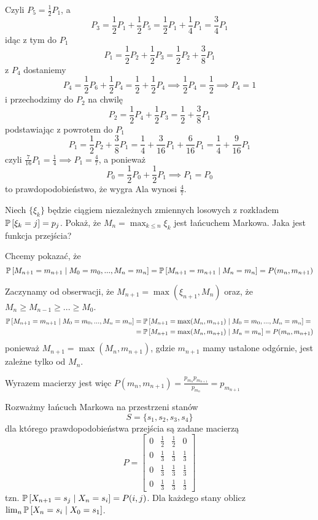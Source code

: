 \begin{solution}
  Czyli $P_5=\frac{1}{2}P_1$, a 
  $$P_3=\frac{1}{2}P_1+\frac{1}{2}P_5=\frac{1}{2}P_1+\frac{1}{4}P_1=\frac{3}{4}P_1$$
  idąc z tym do $P_1$
  $$P_1=\frac{1}{2}P_2+\frac{1}{2}P_3=\frac{1}{2}P_2+\frac{3}{8}P_1$$
  z $P_4$ dostaniemy
  $$P_4=\frac{1}{2} P_6+\frac{1}{2}P_4=\frac{1}{2}+\frac{1}{2}P_4\implies \frac{1}{2}P_4=\frac{1}{2}\implies P_4=1$$
  i przechodzimy do $P_2$ na chwilę
  $$P_2=\frac{1}{2}P_4+\frac{1}{2}P_3=\frac{1}{2}+\frac{3}{8}P_1$$
  podstawiając z powrotem do $P_1$
  $$P_1=\frac{1}{2}P_2+\frac{3}{8}P_1=\frac{1}{4}+\frac{3}{16}P_1+\frac{6}{16}P_1=\frac{1}{4}+\frac{9}{16}P_1$$
  czyli $\frac{7}{16}P_1=\frac{1}{4}\implies P_1=\frac{4}{7}$, a ponieważ
  $$P_0=\frac{1}{2}P_0+\frac{1}{2}P_1\implies P_1=P_0$$
  to prawdopodobieństwo, że wygra Ala wynosi $\frac{4}{7}$.

\end{solution}

\begin{problem}
  Niech $\{\xi_k\}$ będzie ciągiem niezależnych zmiennych losowych z rozkładem $\prob{\xi_k=j}=p_j$. Pokaż, że $M_n=\max_{k\leq n}\xi_k$ jest łańcuchem Markowa. Jaka jest funkcja przejścia?
\end{problem}

\begin{solution}
  Chcemy pokazać, że
  $$\prob{M_{n+1}=m_{n+1}}{M_0=m_0,...,M_n=m_n}=\prob{M_{n+1}=m_{n+1}}{M_n=m_n}=P(m_n,m_{n+1})$$

  Zaczynamy od obserwacji, że $M_{n+1}=\max (\xi_{n+1},M_n)$ oraz, że $M_n\geq M_{n-1}\geq ...\geq M_0$. 
  \begin{align*}
    \prob{M_{n+1}=m_{n+1}}{M_0=m_0,...,M_n=m_n}&=\prob{M_{n+1}=\max(M_n, m_{n+1})}{M_0=m_0,...,M_n=m_n}=\\ 
                                               &=\prob{M_{n+1}=\max(M_n,m_{n+1})}{M_n=m_n}=P(m_n, m_{n+1})
  \end{align*}
  ponieważ $M_{n+1}=\max(M_n,m_{n+1})$, gdzie $m_{n+1}$ mamy ustalone odgórnie, jest zależne tylko od $M_n$.
  
  Wyrazem macierzy jest więc $P(m_n,m_{n+1})=\frac{p_{m_n}p_{m_{n+1}}}{p_{m_n}}=p_{m_{n+1}}$
\end{solution}

\begin{problem}
  Rozważmy łańcuch Markowa na przestrzeni stanów 
  $$S=\{s_1, s_2,s_3,s_4\}$$ 
  dla którego prawdopodobieństwa przejścia są zadane macierzą
  $$P=\begin{bmatrix}0 &\frac{1}{2} & \frac{1}{2} & 0\\ 
  0 & \frac{1}{3} &\frac{1}{3} & \frac{1}{3}\\ 
  0 & \frac{1}{3} & \frac{1}{3} & \frac{1}{3}\\ 
0 & \frac{1}{3} & \frac{1}{3} & \frac{1}{3}\end{bmatrix}$$
tzn. $\prob{X_{n+1}=s_j}{X_n=s_i}=P(i,j)$. Dla każdego stany oblicz $\lim_n \prob{X_n=s_i}{X_0=s_1}$.
\end{problem}


